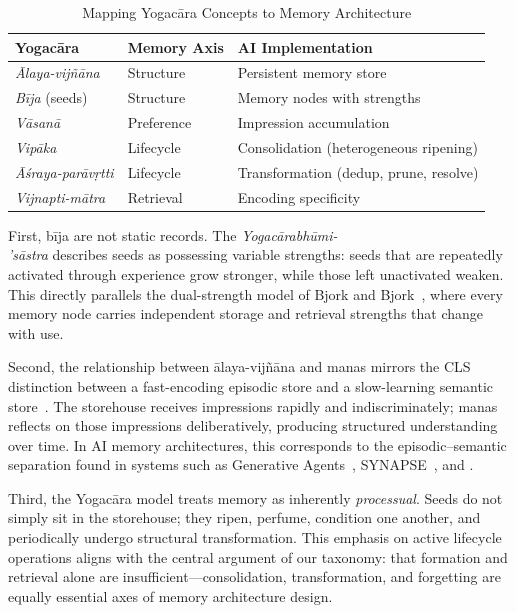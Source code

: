\begin{table}[t]
\centering
\caption{Mapping Yogac\=ara Concepts to Memory Architecture}
\label{tab:yogacara-mapping}
\begin{tabular}{@{}L{2.2cm}L{2.2cm}L{3cm}@{}}
\toprule
\textbf{Yogac\=ara} & \textbf{Memory Axis} & \textbf{AI Implementation} \\
\midrule
\emph{\=Alaya-vij\~n\=ana} & Structure & Persistent memory store \\
\emph{B\=ija} (seeds) & Structure & Memory nodes with strengths \\
\emph{V\=asan\=a} & Preference & Impression accumulation \\
\emph{Vip\=aka} & Lifecycle & Consolidation (heterogeneous ripening) \\
\emph{\=A\'sraya-par\=av\d{r}tti} & Lifecycle & Transformation (dedup, prune, resolve) \\
\emph{Vijnapti-m\=atra} & Retrieval & Encoding specificity \\
\bottomrule
\end{tabular}
\end{table}

First, b\=ija are not static records.  The
\emph{Yogac\=arabh\=umi-\\'s\=astra} describes seeds as possessing
variable strengths: seeds that are repeatedly activated through
experience grow stronger, while those left unactivated weaken.  This
directly parallels the dual-strength model of Bjork and
Bjork~\cite{bjork1992}, where every memory node carries independent
storage and retrieval strengths that change with use.

Second, the relationship between \=alaya-vij\~n\=ana and manas mirrors
the CLS distinction between a fast-encoding episodic store and a
slow-learning semantic store~\cite{mcclelland1995}.  The storehouse
receives impressions rapidly and indiscriminately; manas reflects on
those impressions deliberatively, producing structured understanding
over time.  In AI memory architectures, this corresponds to the
episodic--semantic separation found in systems such as Generative
Agents~\cite{park2023generative}, SYNAPSE~\cite{jiang2026synapse}, and
\alaya{}.

Third, the Yogac\=ara model treats memory as inherently
\emph{processual}.  Seeds do not simply sit in the storehouse; they
ripen, perfume, condition one another, and periodically undergo
structural transformation.  This emphasis on active lifecycle operations
aligns with the central argument of our taxonomy: that formation and
retrieval alone are insufficient---consolidation, transformation, and
forgetting are equally essential axes of memory architecture design.

